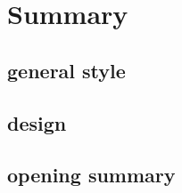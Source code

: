 \section{Summary}

\subsection{general style}


\subsection{design}


\subsection{opening summary}




